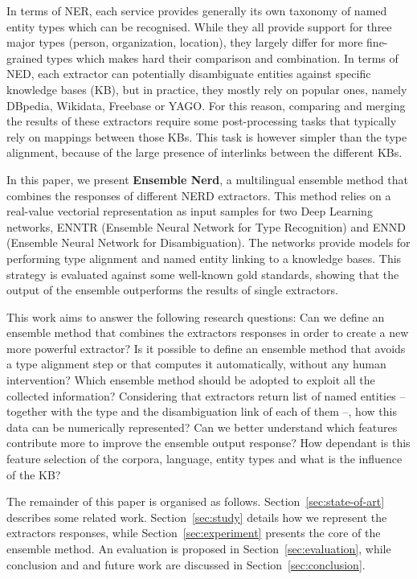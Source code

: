 \documentclass{llncs}
\newcommand{\secref}[1]{\mbox{Section~\ref{#1}}}
\begin{document}
In terms of NER, each service provides generally its own taxonomy of named entity types which can be recognised. While they all provide support for three major types (person, organization, location), they largely differ for more fine-grained types which makes hard their comparison and combination. In terms of NED, each extractor can potentially disambiguate entities against specific knowledge bases (KB), but in practice, they mostly rely on popular ones, namely DBpedia, Wikidata, Freebase or YAGO. For this reason, comparing and merging the results of these extractors require some post-processing tasks that typically rely on mappings between those KBs. This task is however simpler than the type alignment, because of the large presence of interlinks between the different KBs.

In this paper, we present \textbf{Ensemble Nerd}, a multilingual ensemble method that combines the responses of different NERD extractors. This method relies on a real-value vectorial representation as input samples for two Deep Learning networks, ENNTR (Ensemble Neural Network for Type Recognition) and ENND (Ensemble Neural Network for Disambiguation). The networks provide models for performing type alignment and named entity linking to a knowledge bases. This strategy is evaluated against some well-known gold standards, showing that the output of the ensemble outperforms the results of single extractors. 

This work aims to answer the following research questions: Can we define an ensemble method that combines the extractors responses in order to create a new more powerful extractor? Is it possible to define an ensemble method that avoids a type alignment step or that computes it automatically, without any human intervention? Which ensemble method should be adopted to exploit all the collected information? Considering that extractors return list of named entities -- together with the type and the disambiguation link of each of them --, how this data can be numerically represented? Can we better understand which features contribute more to improve the ensemble output response? How dependant is this feature selection of the corpora, language, entity types and what is the influence of the KB?

The remainder of this paper is organised as follows. \secref{sec:state-of-art} describes some related work. \secref{sec:study} details how we represent the extractors responses, while \secref{sec:experiment} presents the core of the ensemble method. An evaluation is proposed in \secref{sec:evaluation}, while conclusion and and future work are discussed in \secref{sec:conclusion}.
\end{document}
